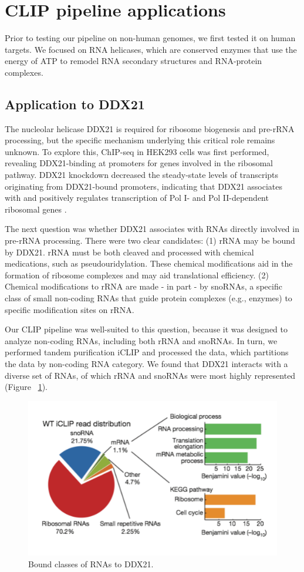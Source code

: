 \section{CLIP pipeline applications}

Prior to testing our pipeline on non-human genomes, we first tested it on human targets. We focused on RNA helicases, which are conserved enzymes that use the energy of ATP to remodel RNA secondary structures and RNA-protein complexes. 

\subsection{Application to DDX21}

The nucleolar helicase DDX21 is required for ribosome biogenesis and pre-rRNA processing, but the specific mechanism underlying this critical role remains unknown. To explore this, ChIP-seq in HEK293 cells was first performed, revealing DDX21-binding at promoters for genes involved in the ribosomal pathway. DDX21 knockdown decreased the steady-state levels of transcripts originating from DDX21-bound promoters, indicating that DDX21 associates with and positively regulates transcription of Pol I- and Pol II-dependent ribosomal genes \cite{Calo:2014ix}.

The next question was whether DDX21 associates with RNAs directly involved in pre-rRNA processing. There were two clear candidates: (1) rRNA may be bound by DDX21. rRNA must be both cleaved and processed with chemical medications, such as pseudouridylation. These chemical modifications aid in the formation of ribosome complexes and may aid translational efficiency. (2) Chemical modifications to rRNA are made - in part - by snoRNAs, a specific class of small non-coding RNAs that guide protein complexes (e.g., enzymes) to specific modification sites on rRNA. 

Our CLIP pipeline was well-suited to this question, because it was designed to analyze non-coding RNAs, including both rRNA and snoRNAs. In turn, we performed tandem purification iCLIP and processed the data, which partitions the data by non-coding RNA category. We found that DDX21 interacts with a diverse set of RNAs, of which rRNA and snoRNAs were most highly represented (Figure ~\ref{fig:Fig16}).

\begin{figure}
\center\includegraphics[width=120mm,scale=0.5]{Figures/Fig16}
\caption{Bound classes of RNAs to DDX21.}
\label{fig:Fig16}
\end{figure}

